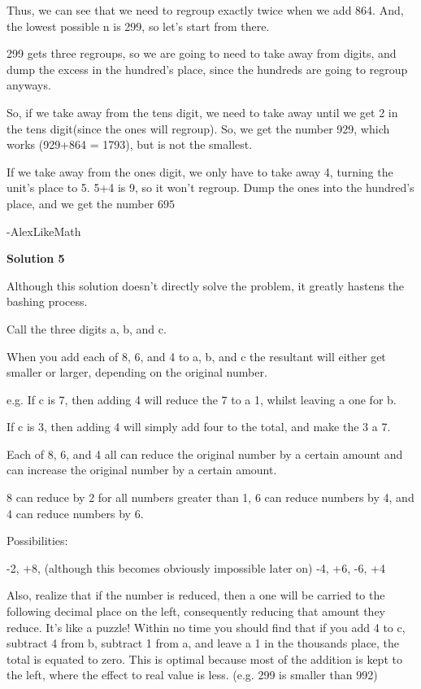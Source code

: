 \begin{enumerate}
 Thus, we can see that we need to regroup exactly twice when we add 864. And, the lowest possible n is 299, so let's start from there.

 299 gets three regroups, so we are going to need to take away from digits, and dump the excess in the hundred's place, since the hundreds are going to regroup anyways.

 So, if we take away from the tens digit, we need to take away until we get 2 in the tens digit(since the ones will regroup). So, we get the number 929, which works (929+864 = 1793), but is not the smallest. 

 If we take away from the ones digit, we only have to take away 4, turning the unit's place to 5. 5+4 is 9, so it won't regroup. Dump the ones into the hundred's place, and we get the number $\boxed{695}$

 -AlexLikeMath

 



\textbf{Solution 5}

Although this solution doesn't directly solve the problem, it greatly hastens the bashing process.

 Call the three digits a, b, and c.

 When you add each of 8, 6, and 4 to a, b, and c the resultant will either get smaller or larger, depending on the original number.

 
e.g. If c is 7, then adding 4 will reduce the 7 to a 1, whilst leaving a one for b. 

 If c is 3, then adding 4 will simply add four to the total, and make the 3 a 7.

 
Each of 8, 6, and 4 all can reduce the original number by a certain amount and can increase the original number by a certain amount.

 8 can reduce by 2 for all numbers greater than 1, 6 can reduce numbers by 4, and 4 can reduce numbers by 6.

 
Possibilities:

 -2, +8, (although this becomes obviously impossible later on) -4, +6, -6, +4

 
Also, realize that if the number is reduced, then a one will be carried to the following decimal place on the left, consequently reducing that amount they reduce. It's like a puzzle! Within no time you should find that if you add 4 to c, subtract 4 from b, subtract 1 from a, and leave a 1 in the thousands place, the total is equated to zero. This is optimal because most of the addition is kept to the left, where the effect to real value is less. (e.g. 299 is smaller than 992)


\end{enumerate}
